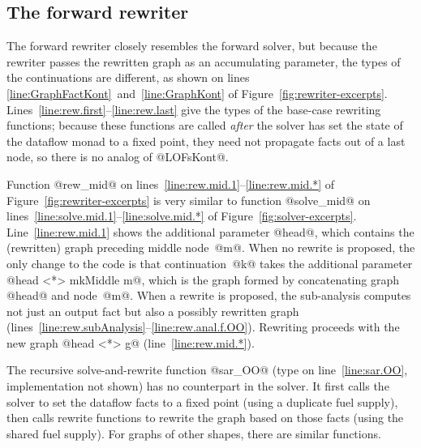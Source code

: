 \documentclass[blockstyle,preprint,natbib,nocopyrightspace]{sigplanconf}
\newcommand\lineref[1]{line~\ref{line:#1}}
\newcommand\linepairref[2]{lines \ref{line:#1}~and~\ref{line:#2}}
\newcommand\linerangeref[2]{\mbox{lines~\ref{line:#1}--\ref{line:#2}}}
\newcommand\Lineref[1]{Line~\ref{line:#1}}
\newcommand\Linerangeref[2]{\mbox{Lines~\ref{line:#1}--\ref{line:#2}}}
\newcommand\seclabel[1]{\label{sec:#1}}
\newcommand\figref[1]{Figure~\ref{fig:#1}}
\begin{document}



\subsection{The forward rewriter}

\seclabel{forward-rewriter}

The forward rewriter closely resembles the
forward solver, but because the rewriter passes the rewritten graph as
an accumulating parameter, the types of the continuations are
different, as shown on \linepairref{GraphFactKont}{GraphKont} of
\figref{rewriter-excerpts}. 
\Linerangeref{rew.first}{rew.last} give the types of the base-case
rewriting functions; because these functions are called \emph{after}
the solver has set the state of the dataflow monad to a fixed
point, they need not propagate facts out of a last node, so there is
no analog of @LOFsKont@.

Function @rew_mid@ on \linerangeref{rew.mid.1}{rew.mid.*} of
\figref{rewriter-excerpts} is very similar to function @solve_mid@ on 
\linerangeref{solve.mid.1}{solve.mid.*} of \figref{solver-excerpts}.
\Lineref{rew.mid.1} shows the additional parameter @head@, which
contains the (rewritten) graph preceding middle node~@m@.
When no rewrite is proposed, the only change to the code is that
continuation~@k@ takes the additional parameter
@head <*> mkMiddle m@,
which is the graph formed by concatenating graph @head@ and node~@m@. 
When a rewrite is proposed, the sub-analysis computes not just an
output fact but also a possibly rewritten graph
(\linerangeref{rew.subAnalysis}{rew.anal.f.OO}).
Rewriting proceeds with the new graph @head <*> g@
(\lineref{rew.mid.*}).

The recursive solve-and-rewrite function @sar_OO@ (type on
\lineref{sar.OO}, implementation not shown) 
has no counterpart in the solver.
It first calls the solver to set the dataflow facts to a fixed
point (using a duplicate fuel supply), then calls rewrite functions to
rewrite the graph based on 
those facts (using the shared fuel supply). 
For graphs of other shapes,
there are similar functions.
\end{document}
